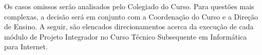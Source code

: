 \documentclass[
	12pt,				%
	openright,			%
	twoside,			%
	a4paper,			%
	chapter=TITLE,		%
	english,			%
	french,				%
	spanish,			%
	brazil,				%
	]{abntex2}
\begin{document}
Os casos omissos serão analisados pelo Colegiado do Curso. Para questões mais complexas, a decisão será em conjunto com a Coordenação do Curso e a Direção de Ensino. A seguir, são elencados direcionamentos acerca da execução de cada módulo de Projeto Integrador no Curso Técnico Subsequente em Informática para Internet.


%
%
%
%
%
%
\end{document}
